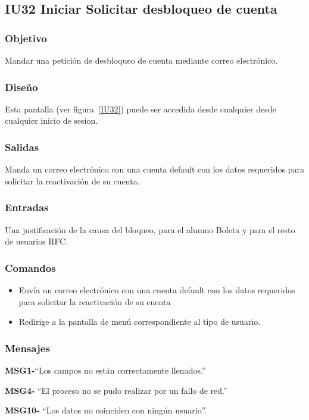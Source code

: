 
\subsection{IU32 Iniciar Solicitar desbloqueo de cuenta}

\subsubsection{Objetivo}
    Mandar una petición de desbloqueo de cuenta mediante correo electrónico.

\subsubsection{Diseño}
	Esta pantalla  (ver figura~\ref{IU32}) puede ser accedida desde cualquier desde cualquier inicio de sesion.



\subsubsection{Salidas}

    Manda un correo electrónico con una cuenta default con los datos requeridos para solicitar la reactivación de su cuenta.

\subsubsection{Entradas}
    Una justificación de la causa del bloqueo, para el alumno Boleta y para el resto de usuarios RFC.


\subsubsection{Comandos}
\begin{itemize}

    \item {} Envía un correo electrónico con una cuenta default con los datos requeridos para solicitar la reactivación de su cuenta
    \item {} Redirige a la pantalla de menú correspondiente al tipo de usuario.
	
\end{itemize}

\subsubsection{Mensajes}

\begin{Citemize}
	\item {\bf MSG1-}{``Los campos no están correctamente llenados.''}
	\item {\bf MSG4-}  ``El proceso no se pudo realizar por un fallo de red.''
	\item {\bf MSG10-}  ``Los datos no coinciden con ningún usuario''.
\end{Citemize}
